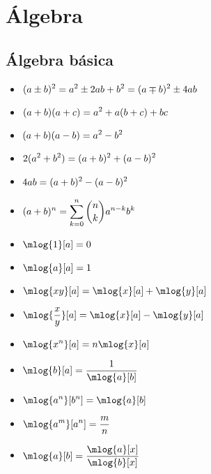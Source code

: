 \section{Álgebra}
\subsection{Álgebra básica}
\begin{itemize}
	\item $\displaystyle(a\pm b)^{2} = a^{2} \pm 2ab + b^{2} = (a \mp b)^{2} \pm 4ab$
	\item $\displaystyle(a + b)(a + c) = a^{2} + a(b + c) + bc$
	\item $\displaystyle(a + b)(a - b) = a^{2} - b^{2}$
	\item $\displaystyle2(a^{2} + b^{2}) = (a + b)^{2} + (a - b)^{2}$
	\item $\displaystyle4ab = (a + b)^{2} - (a - b)^{2}$
	\item $\displaystyle(a + b)^{n} =\sum_{k = 0}^{n}\binom{n}{k}a^{n - k}b^{k}$
	\item $\ds\mlog{1}[a] = 0$
	\item $\ds\mlog{a}[a] = 1$
	\item $\ds\mlog{xy}[a] =\mlog{x}[a] +\mlog{y}[a]$
	\item $\ds\mlog{\dfrac{x}{y}}[a] =\mlog{x}[a] -\mlog{y}[a]$
	\item $\ds\mlog{x^{n}}[a] = n\mlog{x}[a]$
	\item $\ds\mlog{b}[a] =\dfrac{1}{\mlog{a}[b]}$
	\item $\ds\mlog{a^{n}}[b^{n}] =\mlog{a}[b]$
	\item $\ds\mlog{a^{m}}[a^{n}] =\dfrac{m}{n}$
	\item $\ds\mlog{a}[b] =\dfrac{\mlog{a}[x]}{\mlog{b}[x]}$
\end{itemize}
